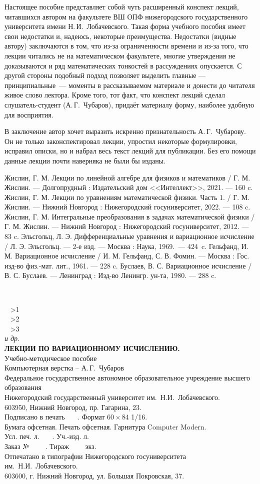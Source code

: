 \documentclass[10pt,a5paper,openany]{book}
\theoremstyle{definition}
\newcommand{\lastpage}{
	\clearpage
	\thispagestyle{empty}
	~
	\vfill
	\begin{center}
		\athNA~\textbf{\athFA}
		\ifnum\numAuths>1\\\athNB~\textbf{\athFB}\fi
		\ifnum\numAuths>2\\\athNC~\textbf{\athFC}\fi
		\ifnum\numAuths>3\\\textit{и др.}\fi
		\\[12pt]
		\textbf{\MakeUppercase{\setTitle.}}\\[12pt]
		\setKind \\[24pt]
		Компьютерная верстка -- А.\,Г.~Чубаров\\[12pt]
		Федеральное государственное автономное образовательное учреждение высшего образования\\
		Нижегородский государственный университет им.~Н.И.~Лобачевского.\\
		603950, Нижний Новгород, пр. Гагарина, 23.\\[12pt]		
		Подписано в печать \ \ \ . Формат $60\times84$ 1/16.\\
		Бумага офсетная. Печать офсетная. Гарнитура Computer Modern.\\
		Усл. печ. л. \ \ \ . Уч.-изд. л.\\
		Заказ № \ \ \ \ . Тираж \ \ \ \ экз.\\[12pt]
		Отпечатано в типографии Нижегородского госуниверситета
		им.~Н.И.~Лобачевского.\\
		603600, г. Нижний Новгород, ул. Большая Покровская, 37.
	\end{center}
}
\newcommand{\setTitle}{Лекции по вариационному исчислению}
\newcommand{\numAuths}{1}
\newcommand{\setKind}{Учебно-методическое пособие}
\begin{document}
	Настоящее пособие представляет собой чуть расширенный конспект лекций, читавшихся автором на факультете ВШ ОПФ нижегородского государственного университета имени Н.\,И.~Лобачевского. Такая форма учебного пособия имеет свои недостатки и, надеюсь, некоторые преимущества. Недостатки (видные автору) заключаются в том, что из-за ограниченности времени и из-за того, что лекции читались не на математическом факультете, многие утверждения не доказываются и ряд математических тонкостей в рассуждениях опускается. С другой стороны подобный подход позволяет выделить главные --- принципиальные~--- моменты в рассказываемом материале и донести до читателя живое слово лектора. Кроме того, тот факт, что конспект лекций сделал слушатель-студент (А.\,Г.~Чубаров), придаёт материалу форму, наиболее удобную для восприятия.
	
	В заключение автор хочет выразить искренно признательность А.\,Г.~Чубарову. Он не только законспектировал лекции, упростил некоторые формулировки, исправил описки, но и набрал весь текст лекций для публикации. Без его помощи данные лекции почти наверняка не были бы изданы.

	
	
	
	
	
	
	
	
	
	

\begin{thebibliography}{99}
	\label{bibliography}
	 Жислин, Г. М. Лекции по линейной алгебре для физиков и математиков / Г. М. Жислин. --- Долгопрудный : Издательский дом <<Интеллект>>, 2021. --- 160 c.
	 Жислин, Г. М. Лекции по уравнениям математической физики. Часть 1.  / Г. М. Жислин. --- Нижний Новгород : Нижегородский госуниверситет, 2022. --- 108 c. 
	 Жислин, Г. М. Интегральные преобразования в задачах математической физики / Г. М. Жислин. --- Нижний Новгород : Нижегородский госуниверситет, 2012. --- 83 c.
	 Эльсгольц, Л. Э. Дифференциальные уравнения и вариационное исчисление / Л. Э. Эльсгольц. --- 2-е изд. --- Москва : Наука, 1969.~--- 424~c.
	 Гельфанд, И. М. Вариационное исчисление / И. М. Гельфанд, С. В. Фомин. --- Москва : Гос. изд-во физ.-мат. лит., 1961. --- 228 c.
	 Буслаев, В. С. Вариационное исчисление / В. С. Буслаев. --- Ленинград : Изд-во Ленингр. ун-та, 1980. --- 288 c.
\end{thebibliography}
\lastpage
\end{document}
